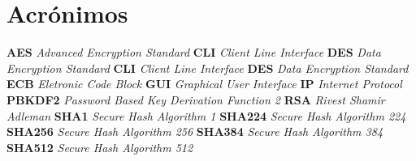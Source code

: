 \chapter*{Acrónimos}
\label{chap:acro}

\begin{flushleft}
\setlength{\parskip}{1em}
\setlength{\parindent}{0pt}

  \textbf{AES}\textit{ Advanced Encryption Standard}\newline
  \textbf{CLI}\textit{ Client Line Interface}\newline
  \textbf{DES}\textit{ Data Encryption Standard}\newline
  \textbf{CLI}\textit{ Client Line Interface}  \newline
  \textbf{DES}\textit{ Data Encryption Standard}\newline
  \textbf{ECB}\textit{ Eletronic Code Block}\newline
  \textbf{GUI}\textit{ Graphical User Interface}\newline
  \textbf{IP}\textit{ Internet Protocol}\newline
  \textbf{PBKDF2}\textit{ Password Based Key Derivation Function 2}\newline
   \textbf{RSA}\textit{ Rivest Shamir Adleman}\newline
   \textbf{SHA1}\textit{ Secure Hash Algorithm 1}\newline
   \textbf{SHA224}\textit{ Secure Hash Algorithm 224}\newline
   \textbf{SHA256}\textit{ Secure Hash Algorithm 256}\newline  
  \textbf{SHA384}\textit{ Secure Hash Algorithm 384}\newline
   \textbf{SHA512}\textit{ Secure Hash Algorithm 512}\newline
\end{flushleft}